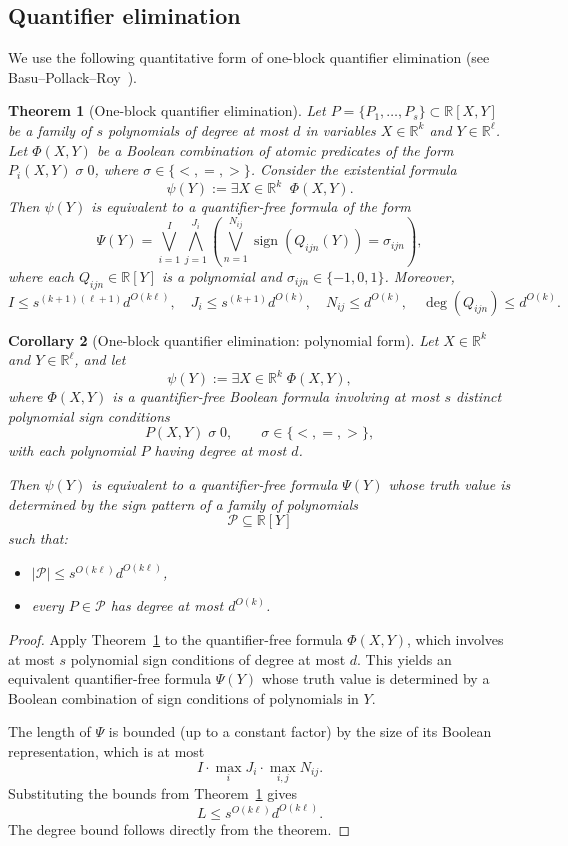 \documentclass[11pt]{article}
\theoremstyle{plain}
\newtheorem{theorem}{Theorem}[section]
\newtheorem{corollary}[theorem]{Corollary}
\theoremstyle{definition}
\theoremstyle{remark}
\newcommand{\R}{\mathbb{R}}
\begin{document}
\subsection{Quantifier elimination}

We use the following quantitative form of one-block quantifier elimination
(see Basu--Pollack--Roy~\cite[Theorem~14.16]{basu2006}).

\begin{theorem}[One-block quantifier elimination]\label{thm:qe}
Let $P = \{P_1,\dots,P_s\} \subset \R[X,Y]$ be a family of $s$ polynomials
of degree at most $d$ in variables $X \in \R^{k}$ and $Y \in \R^{\ell}$.
Let $\Phi(X,Y)$ be a Boolean combination of atomic predicates of the form
$P_i(X,Y) \;\sigma\; 0$, where $\sigma \in \{<,=,>\}$. Consider the existential formula
\[
\psi(Y) := \exists X \in \R^k \;\; \Phi(X,Y).
\]
Then $\psi(Y)$ is equivalent to a quantifier-free formula of the form
\[
\Psi(Y)
=
\bigvee_{i=1}^{I}
\bigwedge_{j=1}^{J_i}
\left(
\bigvee_{n=1}^{N_{ij}} \operatorname{sign}(Q_{ijn}(Y)) = \sigma_{ijn}
\right),
\]
where each $Q_{ijn} \in \R[Y]$ is a polynomial and $\sigma_{ijn} \in \{-1,0,1\}$.
Moreover,
\[
I \le s^{(k+1)(\ell+1)} d^{O(k\ell)}, \quad
J_i \le s^{(k+1)} d^{O(k)}, \quad
N_{ij} \le d^{O(k)}, \quad
\deg(Q_{ijn}) \le d^{O(k)}.
\]
\end{theorem}


\begin{corollary}[One-block quantifier elimination: polynomial form]
\label{cor:qe-poly}
Let $X \in \R^k$ and $Y \in \R^\ell$, and let
\[
\psi(Y) := \exists X \in \R^k\; \Phi(X,Y),
\]
where $\Phi(X,Y)$ is a quantifier-free Boolean formula involving at most
$s$ distinct polynomial sign conditions
\[
P(X,Y)\;\sigma\;0,
\qquad \sigma \in \{<,=,>\},
\]
with each polynomial $P$ having degree at most $d$.

Then $\psi(Y)$ is equivalent to a quantifier-free formula $\Psi(Y)$ whose
truth value is determined by the sign pattern of a family of polynomials
\[
\mathcal P \subseteq \R[Y]
\]
such that:
\begin{itemize}
    \item $|\mathcal P| \le s^{O(k\ell)} d^{O(k\ell)}$,
    \item every $P \in \mathcal P$ has degree at most $d^{O(k)}$.
\end{itemize}
\end{corollary}


\begin{proof}
Apply Theorem~\ref{thm:qe} to the quantifier-free formula $\Phi(X,Y)$,
which involves at most $s$ polynomial sign conditions of degree at most $d$.
This yields an equivalent quantifier-free formula $\Psi(Y)$ whose truth
value is determined by a Boolean combination of sign conditions of
polynomials in $Y$.

The length of $\Psi$ is bounded (up to a constant factor) by the size
of its Boolean representation, which is at most
\[
I \cdot \max_i J_i \cdot \max_{i,j} N_{ij}.
\]
Substituting the bounds from Theorem~\ref{thm:qe} gives
\[
L \le s^{O(k\ell)} d^{O(k\ell)}.
\]
The degree bound follows directly from the theorem.
\end{proof}
\end{document}
